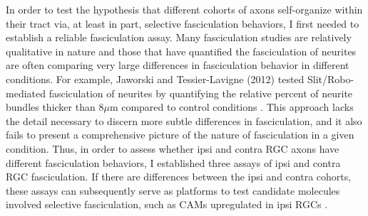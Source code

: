In order to test the hypothesis that different cohorts of axons self-organize within their tract via, at least in part, selective fasciculation behaviors, I first needed to establish a reliable fasciculation assay.
Many fasciculation studies are relatively qualitative in nature and those that have quantified the fasciculation of neurites \invitro{} are often comparing very large differences in fasciculation behavior in different conditions.
For example, Jaworski and Tessier-Lavigne (2012) tested Slit/Robo-mediated fasciculation of neurites by quantifying the relative percent of neurite bundles thicker than 8$\mu$m compared to control conditions \cite{jaworski2012autocrine}.
This approach lacks the detail necessary to discern more subtle differences in fasciculation, and it also fails to present a comprehensive picture of the nature of fasciculation in a given condition. 
Thus, in order to assess whether ipsi and contra RGC axons have different fasciculation behaviors, I established three \invitro{} assays of ipsi and contra RGC fasciculation.
If there are differences between the ipsi and contra cohorts, these \invitro{} assays can subsequently serve as platforms to test candidate molecules involved selective fasciculation, such as CAMs upregulated in ipsi RGCs \cite{wang2016ipsilateral}.